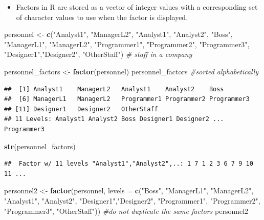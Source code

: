 \documentclass[]{book}
\newenvironment{Shaded}{\begin{snugshade}}{\end{snugshade}}
\newcommand{\KeywordTok}[1]{\textcolor[rgb]{0.13,0.29,0.53}{\textbf{{#1}}}}
\newcommand{\DataTypeTok}[1]{\textcolor[rgb]{0.13,0.29,0.53}{{#1}}}
\newcommand{\StringTok}[1]{\textcolor[rgb]{0.31,0.60,0.02}{{#1}}}
\newcommand{\CommentTok}[1]{\textcolor[rgb]{0.56,0.35,0.01}{\textit{{#1}}}}
\newcommand{\NormalTok}[1]{{#1}}
\providecommand{\tightlist}{%
  \setlength{\itemsep}{0pt}\setlength{\parskip}{0pt}}
\begin{document}
\begin{itemize}
\tightlist
\item
  Factors in R are stored as a vector of integer values with a
  corresponding set of character values to use when the factor is
  displayed.
\end{itemize}

\begin{Shaded}
\begin{Highlighting}[]
\NormalTok{personnel <-}\StringTok{ }\KeywordTok{c}\NormalTok{(}\StringTok{"Analyst1"}\NormalTok{, }\StringTok{"ManagerL2"}\NormalTok{, }\StringTok{"Analyst1"}\NormalTok{, }\StringTok{"Analyst2"}\NormalTok{,  }\StringTok{"Boss"}\NormalTok{, }\StringTok{"ManagerL1"}\NormalTok{, }\StringTok{"ManagerL2"}\NormalTok{, }\StringTok{"Programmer1"}\NormalTok{, }\StringTok{"Programmer2"}\NormalTok{, }\StringTok{"Programmer3"}\NormalTok{, }\StringTok{"Designer1"}\NormalTok{,}\StringTok{"Designer2"}\NormalTok{, }\StringTok{"OtherStaff"}\NormalTok{)  }\CommentTok{# staff in a company}

\NormalTok{personnel_factors <-}\StringTok{ }\KeywordTok{factor}\NormalTok{(personnel)}
\NormalTok{personnel_factors  }\CommentTok{#sorted alphabetically}
\end{Highlighting}
\end{Shaded}

\begin{verbatim}
##  [1] Analyst1    ManagerL2   Analyst1    Analyst2    Boss       
##  [6] ManagerL1   ManagerL2   Programmer1 Programmer2 Programmer3
## [11] Designer1   Designer2   OtherStaff 
## 11 Levels: Analyst1 Analyst2 Boss Designer1 Designer2 ... Programmer3
\end{verbatim}

\begin{Shaded}
\begin{Highlighting}[]
\KeywordTok{str}\NormalTok{(personnel_factors)}
\end{Highlighting}
\end{Shaded}

\begin{verbatim}
##  Factor w/ 11 levels "Analyst1","Analyst2",..: 1 7 1 2 3 6 7 9 10 11 ...
\end{verbatim}

\begin{Shaded}
\begin{Highlighting}[]
\NormalTok{personnel2 <-}\StringTok{ }\KeywordTok{factor}\NormalTok{(personnel, }
                       \DataTypeTok{levels =} \KeywordTok{c}\NormalTok{(}\StringTok{"Boss"}\NormalTok{, }\StringTok{"ManagerL1"}\NormalTok{, }\StringTok{"ManagerL2"}\NormalTok{, }\StringTok{"Analyst1"}\NormalTok{, }\StringTok{"Analyst2"}\NormalTok{,  }\StringTok{"Designer1"}\NormalTok{,}\StringTok{"Designer2"}\NormalTok{, }\StringTok{"Programmer1"}\NormalTok{, }\StringTok{"Programmer2"}\NormalTok{, }\StringTok{"Programmer3"}\NormalTok{, }\StringTok{"OtherStaff"}\NormalTok{))  }\CommentTok{#do not duplicate the same factors}
\NormalTok{personnel2}
\end{Highlighting}
\end{Shaded}
\end{document}
